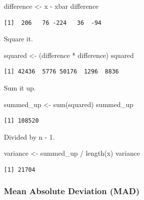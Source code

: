 \documentclass[
  letterpaper,
  DIV=11,
  numbers=noendperiod]{scrartcl}
\newenvironment{Shaded}{\begin{snugshade}}{\end{snugshade}}
\newcommand{\FunctionTok}[1]{\textcolor[rgb]{0.28,0.35,0.67}{#1}}
\newcommand{\NormalTok}[1]{\textcolor[rgb]{0.00,0.23,0.31}{#1}}
\newcommand{\OtherTok}[1]{\textcolor[rgb]{0.00,0.23,0.31}{#1}}
\newcommand{\SpecialCharTok}[1]{\textcolor[rgb]{0.37,0.37,0.37}{#1}}
\begin{document}
\begin{Shaded}
\begin{Highlighting}[]
\NormalTok{difference }\OtherTok{\textless{}{-}}\NormalTok{ x }\SpecialCharTok{{-}}\NormalTok{ xbar}
\NormalTok{difference}
\end{Highlighting}
\end{Shaded}

\begin{verbatim}
[1]  206   76 -224   36  -94
\end{verbatim}

Square it.

\begin{Shaded}
\begin{Highlighting}[]
\NormalTok{squared }\OtherTok{\textless{}{-}}\NormalTok{ (difference }\SpecialCharTok{*}\NormalTok{ difference)}
\NormalTok{squared}
\end{Highlighting}
\end{Shaded}

\begin{verbatim}
[1] 42436  5776 50176  1296  8836
\end{verbatim}

Sum it up.

\begin{Shaded}
\begin{Highlighting}[]
\NormalTok{summed\_up }\OtherTok{\textless{}{-}} \FunctionTok{sum}\NormalTok{(squared)}
\NormalTok{summed\_up}
\end{Highlighting}
\end{Shaded}

\begin{verbatim}
[1] 108520
\end{verbatim}

Divided by n - 1.

\begin{Shaded}
\begin{Highlighting}[]
\NormalTok{variance }\OtherTok{\textless{}{-}}\NormalTok{ summed\_up }\SpecialCharTok{/} \FunctionTok{length}\NormalTok{(x)}
\NormalTok{variance}
\end{Highlighting}
\end{Shaded}

\begin{verbatim}
[1] 21704
\end{verbatim}

\subsubsection{Mean Absolute Deviation
(MAD)}\label{mean-absolute-deviation-mad}
\end{document}

